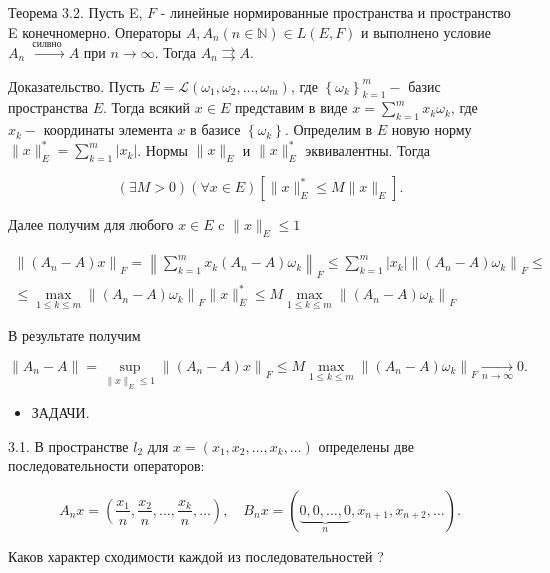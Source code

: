 Теорема 3.2. Пусть E, $F$ - линейные нормированные пространства и пространство E конечномерно. Операторы $A, A_{n}(n \in \mathbb{N}) \in L(E, F)$ и выполнено условие $A_{n} \stackrel{\text { силвно }}{\longrightarrow} A$ при $n \rightarrow \infty$. Тогда $A_{n} \rightrightarrows A$.

Доказательство. Пусть $E=\mathscr{L}\left(\omega_{1}, \omega_{2}, \ldots, \omega_{m}\right)$, где $\left\{\omega_{k}\right\}_{k=1}^{m}-$ базис пространства $E$. Тогда всякий $x \in E$ представим в виде $x=\sum_{k=1}^{m} x_{k} \omega_{k}$, где $x_{k}-$ координаты элемента $x$ в базисе $\left\{\omega_{k}\right\}$. Определим в $E$ новую норму $\|x\|_{E}^{*}=\sum_{k=1}^{m}\left|x_{k}\right|$. Нормы $\|x\|_{E}$ и $\|x\|_{E}^{*}$ эквивалентны. Тогда

$$
(\exists M>0)(\forall x \in E)\left[\|x\|_{E}^{*} \leq M\|x\|_{E}\right] .
$$

Далее получим для любого $x \in E$ c $\|x\|_{E} \leq 1$

$$
\begin{gathered}
\left\|\left(A_{n}-A\right) x\right\|_{F}=\left\|\sum_{k=1}^{m} x_{k}\left(A_{n}-A\right) \omega_{k}\right\|_{F} \leq \sum_{k=1}^{m}\left|x_{k}\right|\left\|\left(A_{n}-A\right) \omega_{k}\right\|_{F} \leq \\
\leq \max _{1 \leq k \leq m}\left\|\left(A_{n}-A\right) \omega_{k}\right\|_{F}\|x\|_{E}^{*} \leq M \max _{1 \leq k \leq m}\left\|\left(A_{n}-A\right) \omega_{k}\right\|_{F}
\end{gathered}
$$

В результате получим

$$
\left\|A_{n}-A\right\|=\sup _{\|x\|_{E} \leq 1}\left\|\left(A_{n}-A\right) x\right\|_{F} \leq M \max _{1 \leq k \leq m}\left\|\left(A_{n}-A\right) \omega_{k}\right\|_{F} \underset{n \rightarrow \infty}{\longrightarrow} 0 .
$$

\begin{itemize}
  \item ЗАДАЧИ.
\end{itemize}

3.1. В пространстве $l_{2}$ для $x=\left(x_{1}, x_{2}, \ldots, x_{k}, \ldots\right)$ определены две последовательности операторов:

$$
A_{n} x=\left(\frac{x_{1}}{n}, \frac{x_{2}}{n}, \ldots, \frac{x_{k}}{n}, \ldots\right), \quad B_{n} x=(\underbrace{0,0, \ldots, 0}_{n}, x_{n+1}, x_{n+2}, \ldots) .
$$

Каков характер сходимости каждой из последовательностей ?

